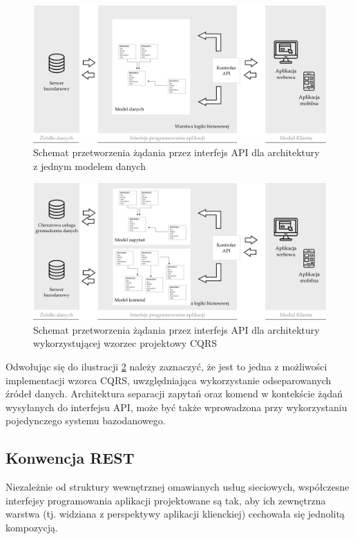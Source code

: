 \begin{figure}[ht]
    \centering
     \includegraphics[width=0.9\linewidth]{rys02/standard-vs-cqrs1.png}
    \caption{Schemat przetworzenia żądania przez interfejs API dla architektury z jednym modelem danych}
    \label{fig:standard-vs-cqrs1}
   \end{figure}

   \begin{figure}[ht]
    \centering
     \includegraphics[width=0.9\linewidth]{rys02/standard-vs-cqrs2.png}
    \caption{Schemat przetworzenia żądania przez interfejs API dla architektury wykorzystującej wzorzec projektowy CQRS}
    \label{fig:standard-vs-cqrs2}
   \end{figure}


Odwołując się do ilustracji \ref{fig:standard-vs-cqrs2} należy zaznaczyć, że jest to jedna z możliwości implementacji wzorca CQRS, uwzględniająca wykorzystanie odseparowanych źródeł danych. Architektura separacji zapytań oraz komend w kontekście żądań wysyłanych do interfejsu API, może być także wprowadzona przy wykorzystaniu pojedynczego systemu bazodanowego.

\subsection*{Konwencja REST}
Niezależnie od struktury wewnętrznej omawianych usług sieciowych, współczesne interfejsy programowania aplikacji projektowane są tak, aby ich zewnętrzna warstwa (tj. widziana z perspektywy aplikacji klienckiej) cechowała się jednolitą kompozycją.

